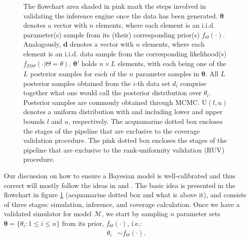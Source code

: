 \documentclass[oneside]{article}
\begin{document}
\begin{figure}
{    The flowchart area shaded in pink mark the steps involved in validating the inference engine once the data has been generated.
    $\boldsymbol{\theta}$ denotes a vector with $n$ elements, where each element is an i.i.d. parameter(s) sample from its (their) corresponding prior(s) $f_\Theta(\cdot)$.
    Analogously, $\boldsymbol{d}$ denotes a vector with $n$ elements, where each element is an i.i.d. data sample from the corresponding likelihood(s) $f_{D|\Theta}(\cdot|\Theta\mathop{=}\theta)$.
    $\boldsymbol{\theta}'$ holds $n \times L$ elements, with each being one of the $L$ posterior samples for each of the $n$ parameter samples in $\boldsymbol{\theta}$.
    All $L$ posterior samples obtained from the $i$-th data set $d_i$ comprise together what one would call the posterior distribution over $\theta_i$.
    Posterior samples are commonly obtained through MCMC.
    $\text{U}(l, u)$ denotes a uniform distribution with and including lower and upper bounds $l$ and $u$, respectively.
    The acquamarine dotted box encloses the stages of the pipeline that are exclusive to the coverage validation procedure.
    The pink dotted box encloses the stages of the pipeline that are exclusive to the rank-uniformity validation (RUV) procedure.}
\label{fig:flowchart}
\vspace{2cm}
\end{figure}

\vspace{.25cm}


Our discussion on how to ensure a Bayesian model is well-calibrated and thus correct will mostly follow the ideas in \citet{Cook06} and \citet{Talts2018}.
The basic idea is presented in the flowchart in figure \ref{fig:flowchart} (acquamarine dotted box and what is above it), and consists of three stages: simulation, inference, and coverage calculation.
Once we have a validated simulator for model $\mathcal{M}$, we start by sampling $n$ parameter sets $\boldsymbol{\theta} = \{\theta_i : 1 \leq i \leq n\}$ from its prior,
$f_\Theta(\cdot)$, i.e.:
\begin{align*}
 \theta_i & \sim f_\Theta(\cdot).
\end{align*}
\end{document}
